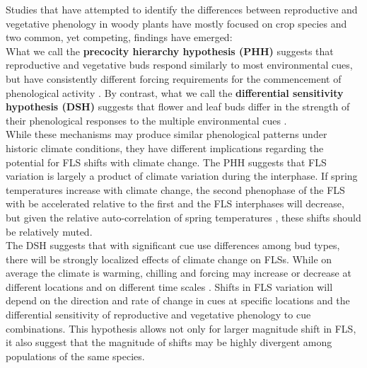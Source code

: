 \documentclass[11pt]{article}
\begin{document}
\noindent Studies that have attempted to identify the differences between reproductive and vegetative phenology in woody plants have mostly focused on crop species and two common, yet competing, findings have emerged:\\

\noindent What we call the \textbf{precocity hierarchy hypothesis (PHH)} suggests that reproductive and vegetative buds respond similarly to most environmental cues, but have consistently different forcing requirements for the commencement of phenological activity \citep{Guo_2014,COSMULESCU:2020aa,Cosmulescu:2018aa}. By contrast, what we call the \textbf{differential sensitivity hypothesis (DSH)} suggests that flower and leaf buds differ in the strength of their phenological responses to the multiple environmental cues \citep{Citadin2001,Gariglio2006,Crepinsek2011,Aslani2009,Mehlenbacher:1991aa}. \\%

\noindent While these mechanisms may produce similar phenological patterns under historic climate conditions, they have different implications regarding the potential for FLS shifts with climate change. The PHH suggests that FLS variation is largely a product of climate variation during the interphase. If spring temperatures increase with climate change, the second phenophase of the FLS with be accelerated relative to the first and the FLS interphases will decrease, but given the relative auto-correlation of spring temperatures \citep{}, these shifts should be relatively muted. \\

\noindent The DSH suggests that with significant cue use differences among bud types, there will be strongly localized effects of climate change on FLSs. While on average the climate is warming, chilling and forcing may increase or decrease at different locations and on different time scales \citep{Ettinger}. Shifts in FLS variation will depend on the direction and rate of change in cues at specific locations and the differential sensitivity of reproductive and vegetative phenology to cue combinations. This hypothesis allows not only for larger magnitude shift in FLS, it also suggest that the magnitude of shifts may be highly divergent among populations of the same species.\\
\end{document}
